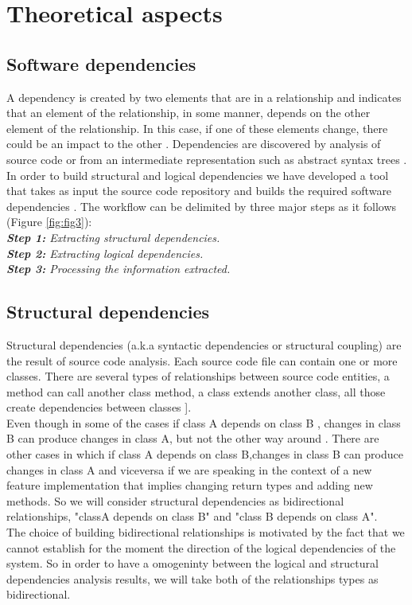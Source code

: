 \chapter{Theoretical aspects}

\section{Software dependencies}
A dependency is created by two elements that are in a relationship and indicates that an element of the relationship, in some manner, depends on the other element of the relationship. In this case, if one of these elements change, there could be an impact to the other \cite{ct2}. Dependencies are discovered by analysis of source code or from an intermediate representation such as abstract syntax trees \cite{ct3} . In order to build structural and logical dependencies we have developed a tool that takes as input the source code repository and builds the required software dependencies . The workﬂow can be delimited by three major steps as it follows  (Figure \ref{fig:fig3}):  \\
\textit{\textbf{Step 1:} Extracting structural dependencies.}\\
\textit{\textbf{Step 2:} Extracting logical dependencies.}\\
\textit{\textbf{Step 3:} Processing the information extracted.}

\section{Structural dependencies}

 Structural dependencies (a.k.a syntactic dependencies or structural coupling) are the result of source code analysis. Each source code ﬁle can contain one or more classes. There are several types of relationships between source code entities, a method can call another class method, a class extends another class, all those create dependencies between classes  \cite{ct4}].\\
\tab Even though in some of the cases if class A depends on class B , changes in class B can produce changes in class A, but not the other way around \cite{ct5} . There are other cases in which if class A depends on class B,changes in class B can produce changes in class A and viceversa if we are speaking in the context of a new feature implementation that implies changing return types and adding new methods. So we will consider structural dependencies as bidirectional relationships, "classA depends on class B" and "class B depends on class A".\\ The choice of building bidirectional relationships is motivated by the fact that we cannot establish for the moment the direction of the logical dependencies of the system. So in order to have a omogeninty between the logical and structural dependencies analysis results, we will take both of the relationships types as bidirectional. 

